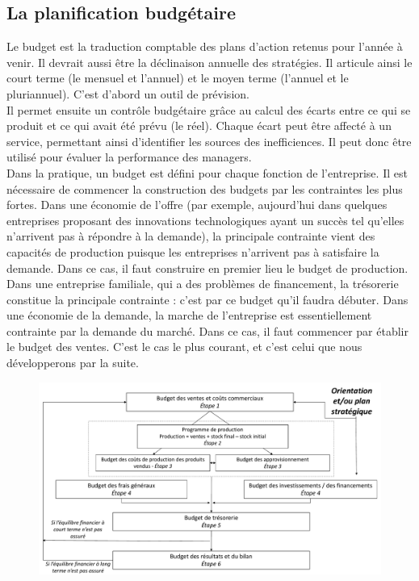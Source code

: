 \documentclass{tufte-handout}
\begin{document}
\subsection{La planification budgétaire}
\label{sec:orgdd39d20}
Le budget est la traduction comptable des plans d'action retenus pour l'année à venir. Il devrait aussi être la déclinaison annuelle des stratégies. Il articule ainsi le court terme (le mensuel et l'annuel) et le moyen terme (l'annuel et le pluriannuel). C'est d'abord un outil de prévision.\\
Il permet ensuite un contrôle budgétaire grâce au calcul des écarts entre ce qui se produit et ce qui avait été prévu (le réel). Chaque écart peut être affecté à un service, permettant ainsi d'identifier les sources des inefficiences. Il peut donc être utilisé pour évaluer la performance des managers.\\

Dans la pratique, un budget est défini pour chaque fonction de l'entreprise. Il est nécessaire de commencer la construction des budgets par les contraintes les plus fortes. Dans une économie de l'offre (par exemple, aujourd'hui dans quelques entreprises proposant des innovations technologiques ayant un succès tel qu'elles n'arrivent pas à répondre à la demande), la principale contrainte vient des capacités de production puisque les entreprises n'arrivent pas à satisfaire la demande. Dans ce cas, il faut construire en premier lieu le budget de production.\\

Dans une entreprise familiale, qui a des problèmes de financement, la trésorerie constitue la principale contrainte : c'est par ce budget qu'il faudra débuter. Dans une économie de la demande, la marche de l'entreprise est essentiellement contrainte par la demande du marché. Dans ce cas, il faut commencer par établir le budget des ventes. C'est le cas le plus courant, et c'est celui que nous développerons par la suite.\\

\begin{figure}[htbp]
\centering
\includegraphics[width=.9\linewidth]{./img/budget.pdf}
\caption{}
\end{figure}
\end{document}

